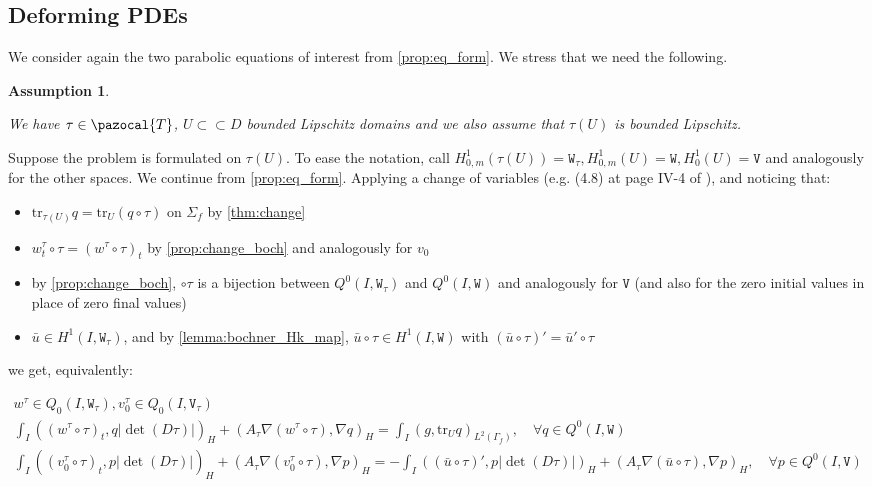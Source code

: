 \documentclass[english,a4paper,9pt,oneside]{scrbook}	%
\theoremstyle{break}
\newtheorem{ass}[equation]{Assumption}
\theoremstyle{remark}
\newcommand{\tr}{\text{tr}}
\newcommand{\cc}{\subset\subset}
\newcommand{\cT}{\pazocal{T}}
\newcommand{\tw}[1]{\texttt{#1}}
\begin{document}
\begin{appendices}
\section{Deforming PDEs}

We consider again the two parabolic equations of interest from \cref{prop:eq_form}. We stress that we need the following.

\begin{ass}
\label{ass:pull}

We have $\tau \in \cT$, $U\cc D$ bounded Lipschitz domains and we also assume that $\tau(U)$ is bounded Lipschitz.
\end{ass}

Suppose the problem is formulated on $\tau(U)$. To ease the notation, call $H^1_{0,m}(\tau(U))=\tw{W}_\tau, H^1_{0,m}(U)=\tw{W}, H^1_0(U)=\tw{V}$ and analogously for the other spaces.
We continue from \cref{prop:eq_form}. Applying a change of variables (e.g. (4.8) at page IV-4 of \cite{murat}), and noticing that:

\begin{itemize}
	\item $\tr_{\tau(U)} q = \tr_U(q\circ \tau)$ on $\Sigma_f$ by \cref{thm:change}
	\item $w_t^\tau\circ \tau = (w^\tau\circ \tau)_t$ by \cref{prop:change_boch} and analogously for $v_0$
	\item by \cref{prop:change_boch}, $\circ \tau$ is a bijection between $Q^0(I,\tw{W}_\tau)$ and $Q^0(I,\tw{W})$ and analogously for $\tw{V}$ (and also for the zero initial values in place of zero final values)
	\item $\bar{u} \in H^1(I,\tw{W}_\tau)$, and by \cref{lemma:bochner_Hk_map}, $\bar{u}\circ \tau \in H^1(I,\tw{W})$ with $(\bar{u}\circ \tau )' = \bar{u}'\circ \tau $
\end{itemize}

we get, equivalently:

\begin{align*}
w^\tau \in Q_0(I, \tw{W}_\tau), v_0^\tau \in Q_0(I,\tw{V}_\tau) \\
\int_I ( (w^\tau\circ \tau)_t , q |\det(D\tau)|)_H+ (A_\tau\nabla (w^\tau\circ \tau), \nabla q)_{H} = \int_I(g,\tr_{U} q)_{L^2(\Gamma_f)}, \quad \forall q \in Q^0(I, \tw{W}) \\
\int_I ( (v_0^\tau\circ \tau)_t,p |\det(D\tau)|)_H + (A_\tau \nabla (v_0^\tau\circ \tau), \nabla p)_{H}=-\int_I((\bar{u}\circ \tau)',p|\det(D\tau)|)_{H}+(A_\tau \nabla (\bar{u} \circ \tau), \nabla p)_{H}, \quad \forall p \in Q^0(I, \tw{V})
\end{align*}


\end{appendices}
\end{document}
